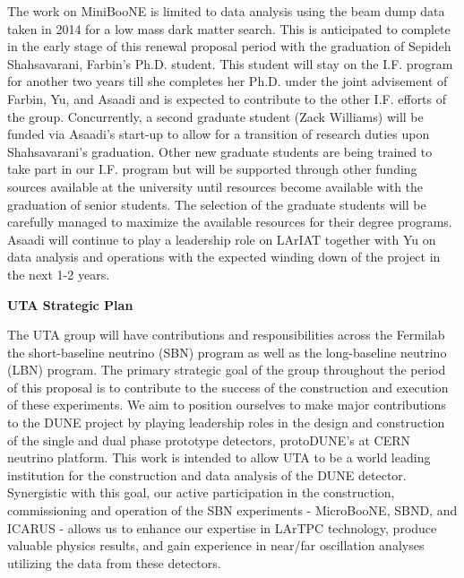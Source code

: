 The work on MiniBooNE is limited to data analysis using the beam dump data taken in 2014 for a low mass dark matter search. This is anticipated to complete in the early stage of this renewal proposal period with the graduation of Sepideh Shahsavarani, Farbin’s Ph.D. student. This student will stay on the I.F. program for another two years till she completes her Ph.D. under the joint advisement of Farbin, Yu, and Asaadi and is expected to contribute to the other I.F. efforts of the group. Concurrently, a second graduate student (Zack Williams) will be funded via Asaadi's start-up to allow for a transition of research duties upon Shahsavarani's graduation.  Other new graduate students are being trained to take part in our I.F. program but will be supported through other funding sources available at the university until resources become available with the graduation of senior students.  The selection of the graduate students will be carefully managed to maximize the available resources for their degree programs. Asaadi will continue to play a leadership role on LArIAT together with Yu on data analysis and operations with the expected winding down of the project in the next 1-2 years.

\begin{center}
\textbf{ \Large{UTA Strategic Plan} }
\end{center} 

The UTA group will have contributions and responsibilities across the Fermilab the short-baseline neutrino (SBN) program as well as the long-baseline neutrino (LBN) program. The primary strategic goal of the group throughout the period of this proposal is to contribute to the success of the construction and execution of these experiments. We aim to position ourselves to make major contributions to the DUNE project by playing leadership roles in the design and construction of the single and dual phase prototype detectors, protoDUNE's at CERN neutrino platform. This work is intended to allow UTA to be a world leading institution for the construction and data analysis of the DUNE detector. Synergistic with this goal, our active participation in the construction, commissioning and operation of the SBN experiments - MicroBooNE, SBND, and ICARUS - allows us to enhance our expertise in LArTPC technology, produce valuable physics results, and gain experience in near/far oscillation analyses utilizing the data from these detectors.


